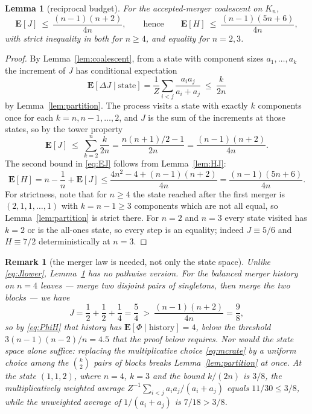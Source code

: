 \documentclass[10pt,a4paper]{amsart}
\newtheorem{lemma}[theorem]{Lemma}
\newtheorem{remark}[theorem]{Remark}
\newcommand{\E}{\mathbf{E}}
\begin{document}
\begin{lemma}[reciprocal budget]
\label{lem:budget}
For the accepted-merger coalescent on $K_n$,
\begin{equation}
\label{eq:EJ}
\E[J]\ \le\ \frac{(n-1)(n+2)}{4n},
\qquad\text{hence}\qquad
\E[H]\ \le\ \frac{(n-1)(5n+6)}{4n},
\end{equation}
with strict inequality in both for $n\ge4$, and equality for $n=2,3$.
\end{lemma}

\begin{proof}
By Lemma~\ref{lem:coalescent}, from a state with component sizes $a_1,\dots,a_k$
the increment of $J$ has conditional expectation
\[
\E[\Delta J\mid \text{state}]=\frac1Z\sum_{i<j}\frac{a_ia_j}{a_i+a_j}
\ \le\ \frac{k}{2n}
\]
by Lemma~\ref{lem:partition}. The process visits a state with exactly $k$
components once for each $k=n,n-1,\dots,2$, and $J$ is the sum of the increments
at those states, so by the tower property
\[
\E[J]\ \le\ \sum_{k=2}^n\frac k{2n}=\frac{n(n+1)/2-1}{2n}=\frac{(n-1)(n+2)}{4n} .
\]
The second bound in \eqref{eq:EJ} follows from Lemma~\ref{lem:HJ}:
\[
\E[H]=n-\frac1n+\E[J]\le\frac{4n^2-4+(n-1)(n+2)}{4n}=\frac{(n-1)(5n+6)}{4n} .
\]
For strictness, note that for $n\ge4$ the state reached after the first merger is
$(2,1,1,\dots,1)$ with $k=n-1\ge3$ components which are not all equal, so
Lemma~\ref{lem:partition} is strict there. For $n=2$ and $n=3$ every state
visited has $k=2$ or is the all-ones state, so every step is an equality; indeed
$J\equiv5/6$ and $H\equiv7/2$ deterministically at $n=3$.
\end{proof}

\begin{remark}[the merger law is needed, not only the state space]
\label{rem:notpathwise}
Unlike \eqref{eq:Jlower}, Lemma~\ref{lem:budget} has no pathwise version. For the
balanced merger history on $n=4$ leaves --- merge two disjoint pairs of
singletons, then merge the two blocks --- we have
\[
J=\frac12+\frac12+\frac14=\frac54\ >\ \frac{(n-1)(n+2)}{4n}=\frac98,
\]
so by \eqref{eq:PhiH} that history has $\E[\Phi\mid\text{history}]=4$, below the
threshold $3(n-1)(n-2)/n=4.5$ that the proof below requires. Nor would the state
space alone suffice: replacing the multiplicative choice \eqref{eq:mcrate} by a
uniform choice among the $\binom k2$ pairs of blocks breaks
Lemma~\ref{lem:partition} at once. At the state $(1,1,2)$, where $n=4$, $k=3$
and the bound $k/(2n)$ is $3/8$, the multiplicatively weighted average
$Z^{-1}\sum_{i<j}a_ia_j/(a_i+a_j)$ equals $11/30\le3/8$, while the unweighted
average of $1/(a_i+a_j)$ is $7/18>3/8$.
\end{remark}
\end{document}
